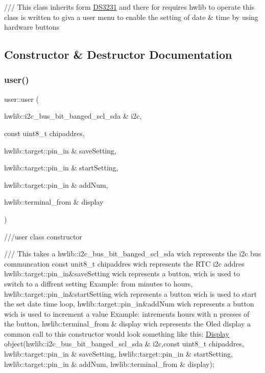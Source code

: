 /// This class inherits form \hyperlink{classDS3231}{D\+S3231} and there for requires hwlib to operate this class is written to giva a user menu to enable the setting of date \& time by using hardware buttons 

\subsection{Constructor \& Destructor Documentation}
\mbox{\label{classuser_a140937f8c81560822a5fc64cfefffcac}} 
\subsubsection{\texorpdfstring{user()}{user()}}
{\footnotesize\ttfamily user\+::user (\begin{DoxyParamCaption}\item[{hwlib\+::i2c\+\_\+bus\+\_\+bit\+\_\+banged\+\_\+scl\+\_\+sda \&}]{i2c,  }\item[{const uint8\+\_\+t}]{chipaddres,  }\item[{hwlib\+::target\+::pin\+\_\+in \&}]{save\+Setting,  }\item[{hwlib\+::target\+::pin\+\_\+in \&}]{start\+Setting,  }\item[{hwlib\+::target\+::pin\+\_\+in \&}]{add\+Num,  }\item[{hwlib\+::terminal\+\_\+from \&}]{display }\end{DoxyParamCaption})}



///user class constructor 

/// This takes a hwlib\+::i2c\+\_\+bus\+\_\+bit\+\_\+banged\+\_\+scl\+\_\+sda wich represents the i2c bus communcation const unit8\+\_\+t chipaddres wich represents the R\+TC i2c addres hwlib\+::target\+::pin\+\_\+in\&save\+Setting wich represents a button, wich is used to switch to a diffrent setting Example\+: from minutes to hours, hwlib\+::target\+::pin\+\_\+in\&start\+Setting wich represents a button wich is used to start the set date time loop, hwlib\+::target\+::pin\+\_\+in\&add\+Num wich represents a button wich is used to increment a value Example\+: intrements hours with n presses of the button, hwlib\+::terminal\+\_\+from \& display wich represents the Oled display a common call to this constructor would look something like this\+: \hyperlink{classDisplay}{Display} object(hwlib\+::i2c\+\_\+bus\+\_\+bit\+\_\+banged\+\_\+scl\+\_\+sda \& i2c,const uint8\+\_\+t chipaddres, hwlib\+::target\+::pin\+\_\+in \& save\+Setting, hwlib\+::target\+::pin\+\_\+in \& start\+Setting, hwlib\+::target\+::pin\+\_\+in \& add\+Num, hwlib\+::terminal\+\_\+from \& display); 

